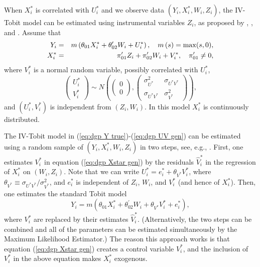 \documentclass[12pt]{article}
\begin{document}
When $X_{i}^{\ast }$ is correlated with $U_{i}^{\ast }$ and we observe data $%
\left( Y_{i},X_{i}^{\ast },W_{i},Z_{i}\right) $, the IV-Tobit model can be
estimated using instrumental variables $Z_{i}$, as proposed by \cite%
{SmithBlundell1986Ecta}, \cite{Newey1987}, and \cite{RiversVuong1988JoE}.
Assume that%
\begin{eqnarray}
Y_{i} &=&m\left( \theta _{01}X_{i}^{\ast }+\theta _{02}^{\prime
}W_{i}+U_{i}^{\ast }\right) ,\text{\quad }m\left( s\right) =\max (s,0),
\label{eq:dgp Y true} \\
X_{i}^{\ast } &=&\pi _{01}^{\prime }Z_{i}+\pi _{02}^{\prime
}W_{i}+V_{i}^{\ast },\quad \pi _{01}^{\prime }\neq 0,
\label{eq:dgp Xstar gen}
\end{eqnarray}%
where $V_{i}^{\ast }$ is a normal random variable, possibly correlated with $%
U_{i}^{\ast }$,%
\begin{equation}
\left( 
\begin{array}{c}
U_{i}^{\ast } \\ 
V_{i}^{\ast }%
\end{array}%
\right) \sim N\left( \left( 
\begin{array}{c}
0 \\ 
0%
\end{array}%
\right) ,%
\begin{pmatrix}
\sigma _{U^{\ast }}^{2} & \sigma _{U^{\ast }V^{\ast }} \\ 
\sigma _{U^{\ast }V^{\ast }} & \sigma _{V^{\ast }}^{2}%
\end{pmatrix}%
\right) ,  \label{eq:dgp UV gen}
\end{equation}%
and $\left( U_{i}^{\ast },V_{i}^{\ast }\right) $ is independent from $\left(
Z_{i},W_{i}\right) $. In this model $X_{i}^{\ast }$ is continuously
distributed.

The IV-Tobit model in (\ref{eq:dgp Y true})-(\ref{eq:dgp UV gen}) can be
estimated using a random sample of $\left( Y_{i},X_{i}^{\ast
},W_{i},Z_{i}\right) $ in two steps, see, e.g., \cite{Wooldridge2010Book}.
First, one estimates $V_{i}^{\ast }$ in equation (\ref{eq:dgp Xstar gen}) by
the residuals $\hat{V}_{i}^{\ast }$ in the regression of $X_{i}^{\ast }$ on $%
\left( W_{i},Z_{i}\right) $. Note that we can write $U_{i}^{\ast
}=e_{i}^{\ast }+\theta _{V^{\ast }}V_{i}^{\ast }$, where $\theta _{V^{\ast
}}\equiv \sigma _{U^{\ast }V^{\ast }}/\sigma _{V^{\ast }}^{2}$, and $%
e_{i}^{\ast }$ is independent of $Z_{i}$, $W_{i}$, and $V_{i}^{\ast }$ (and
hence of $X_{i}^{\ast }$). Then, one estimates the standard Tobit model 
\begin{equation*}
Y_{i}=m\left( \theta _{01}X_{i}^{\ast }+\theta _{02}^{\prime }W_{i}+\theta
_{V^{\ast }}V_{i}^{\ast }+e_{i}^{\ast }\right) ,
\end{equation*}%
where $V_{i}^{\ast }$ are replaced by their estimates $\hat{V}_{i}^{\ast }$.
(Alternatively, the two steps can be combined and all of the parameters can
be estimated simultaneously by the Maximum Likelihood Estimator.) The reason
this approach works is that equation (\ref{eq:dgp Xstar gen}) creates a
control variable $V_{i}^{\ast }$, and the inclusion of $V_{i}^{\ast }$ in
the above equation makes $X_{i}^{\ast }$ exogenous. {}
\end{document}
